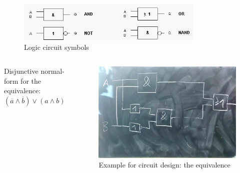 \documentclass{beamer}
\begin{document}
\begin{frame}
  \begin{figure}[H]
\centering
  \includegraphics[width=0.8\textwidth]{gatter}%
  \caption{Logic circuit symbols}%
  \label{fig:logic_symbols}
\end{figure}
\end{frame}


\begin{frame}
  \begin{columns}
  \begin{column}{5cm}
  Disjunctive normal-form for the equivalence: 
  \newline\newline
  $(\overline{a}\land \overline{b})\lor(a\land b)$
  \end{column}
  
  \begin{column}{6cm}
    \begin{figure}[H]
      \centering
      \includegraphics[width=1.1\textwidth]{eq1}%
      \caption{Example for circuit design: the equivalence}%
      \label{fig:equivalence}
    \end{figure}
  \end{column}
  \end{columns}  
\end{frame}
\end{document}
